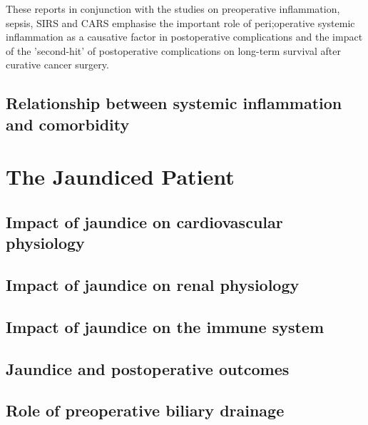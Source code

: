 These reports in conjunction with the studies on preoperative inflammation, sepsis, SIRS and CARS emphasise the important role of peri;operative systemic inflammation as a causative factor in postoperative complications and the impact of the 'second-hit' of postoperative complications on long-term survival after curative cancer surgery.

\subsection{Relationship between systemic inflammation and comorbidity}


\section{The Jaundiced Patient}
\subsection{Impact of jaundice on cardiovascular physiology}
\subsection{Impact of jaundice on renal physiology}
\subsection{Impact of jaundice on the immune system}
\subsection{Jaundice and postoperative outcomes}
\subsection{Role of preoperative biliary drainage}